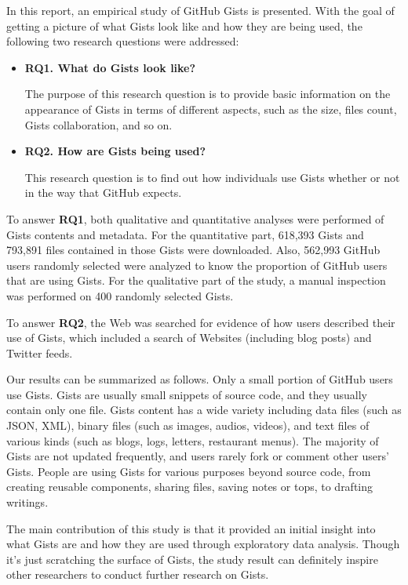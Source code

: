 In this report, an empirical study of GitHub Gists is presented. With the goal of getting a picture of what Gists look like and how they are being used, the following two research questions were addressed:

\begin{itemize}

  \item {\bf RQ1. What do Gists look like?}
  
  The purpose of this research question is to provide basic information on the appearance of Gists in terms of different aspects, such as the size, files count, Gists collaboration, and so on. 

  \item {\bf RQ2. How are Gists being used?}
  
  This research question is to find out how individuals use Gists whether or not in the way that GitHub expects. 
  
\end{itemize}
To answer {\bf RQ1}, both qualitative and quantitative analyses were performed of Gists contents and metadata. For the quantitative part, 618,393 Gists and 793,891 files contained in those Gists were downloaded. Also, 562,993 GitHub users randomly selected were analyzed to know the proportion of GitHub users that are using Gists. For the qualitative part of the study, a manual inspection was performed on 400 randomly selected Gists. 

To answer {\bf RQ2}, the Web was searched for evidence of how users described their use of Gists, which included a search of Websites (including blog posts) and Twitter feeds.

Our results can be summarized as follows. Only a small portion of GitHub users use Gists. Gists are usually small snippets of source code, and they usually contain only one file. Gists content has a wide variety including data files (such as JSON, XML), binary files (such as images, audios, videos), and text files of various kinds (such as blogs, logs, letters, restaurant menus). The majority of Gists are not updated frequently, and users rarely fork or comment other users' Gists. People are using Gists for various purposes beyond source code, from creating reusable components, sharing files, saving notes or tops, to drafting writings.

The main contribution of this study is that it provided an initial insight into what Gists are and how they are used through exploratory data analysis. Though it's just scratching the surface of Gists, the study result can definitely inspire other researchers to conduct further research on Gists.